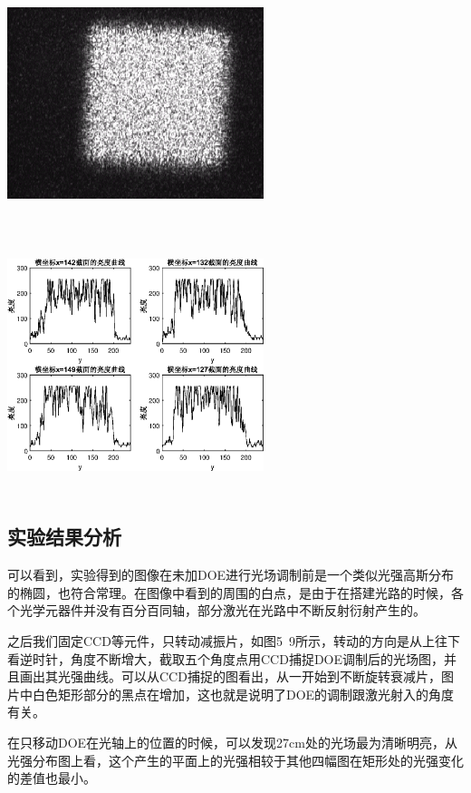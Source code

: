 \documentclass[UTF8]{ctexart}
\makeatletter
\newcommand{\figcaption}{\def\@captype{figure}\caption}
\makeatother
\begin{document}
\begin{center}
			\includegraphics[width=7.5cm,height=7.5cm]{YUANaddDOEmoveCCD29.eps}
			\includegraphics[width=7.5cm,height=7.5cm]{addDOEmoveCCD29.eps}
			\figcaption{加DOE的CCD捕捉图和光亮度曲线(CCD与DOE距离29cm)}\label{addDOEmoveCCD29}
		\end{center}
	\subsection{实验结果分析}	
可以看到，实验得到的图像在未加DOE进行光场调制前是一个类似光强高斯分布的椭圆，也符合常理。在图像中看到的周围的白点，是由于在搭建光路的时候，各个光学元器件并没有百分百同轴，部分激光在光路中不断反射衍射产生的。
	
之后我们固定CCD等元件，只转动减振片，如图5~9所示，转动的方向是从上往下看逆时针，角度不断增大，截取五个角度点用CCD捕捉DOE调制后的光场图，并且画出其光强曲线。可以从CCD捕捉的图看出，从一开始到不断旋转衰减片，图片中白色矩形部分的黑点在增加，这也就是说明了DOE的调制跟激光射入的角度有关。

在只移动DOE在光轴上的位置的时候，可以发现27cm处的光场最为清晰明亮，从光强分布图上看，这个产生的平面上的光强相较于其他四幅图在矩形处的光强变化的差值也最小。
	
\end{document}

